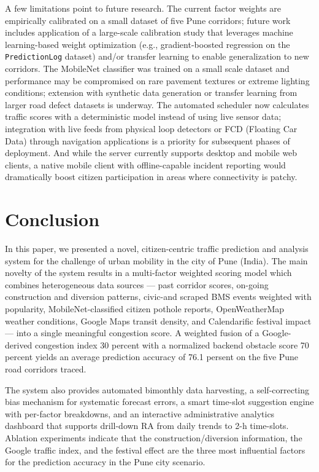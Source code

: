 \documentclass[conference]{IEEEtran}
\begin{document}
A few limitations point to future research. The current factor weights are empirically calibrated on a small dataset of five Pune corridors; future work includes application of a large-scale calibration study that leverages machine learning-based weight optimization (e.g., gradient-boosted regression on the \texttt{PredictionLog} dataset) and/or transfer learning to enable generalization to new corridors. The MobileNet classifier was trained on a small scale dataset and performance may be compromised on rare pavement textures or extreme lighting conditions; extension with synthetic data generation or transfer learning from larger road defect datasets is underway. The automated scheduler now calculates traffic scores with a deterministic model instead of using live sensor data; integration with live feeds from physical loop detectors or FCD (Floating Car Data) through navigation applications is a priority for subsequent phases of deployment. And while the server currently supports desktop and mobile web clients, a native mobile client with offline-capable incident reporting would dramatically boost citizen participation in areas where connectivity is patchy.

\section{Conclusion}
\label{sec:conclusion}

In this paper, we presented a novel, citizen-centric traffic prediction and analysis system for the challenge of urban mobility in the city of Pune (India). The main novelty of the system results in a multi-factor weighted scoring model which combines heterogeneous data sources — past corridor scores, on-going construction and diversion patterns, civic-and scraped BMS events weighted with popularity, MobileNet-classified citizen pothole reports, OpenWeatherMap weather conditions, Google Maps transit density, and Calendarific festival impact — into a single meaningful congestion score. A weighted fusion of a Google-derived congestion index 30 percent with a normalized backend obstacle score 70 percent yields an average prediction accuracy of 76.1 persent on the five Pune road corridors traced.

The system also provides automated bimonthly data harvesting, a self-correcting bias mechanism for systematic forecast errors, a smart time-slot suggestion engine with per-factor breakdowns, and an interactive administrative analytics dashboard that supports drill-down RA from daily trends to 2-h time-slots. Ablation experiments indicate that the construction/diversion information, the Google traffic index, and the festival effect are the three most influential factors for the prediction accuracy in the Pune city scenario.
\end{document}
